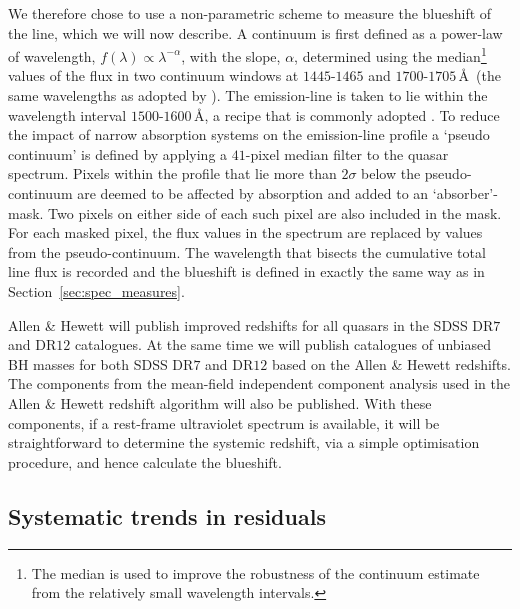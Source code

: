 We therefore chose to use a non-parametric scheme to measure the blueshift of the  line, which we will now describe. 
A continuum is first defined as a power-law of wavelength, $f(\lambda) \propto \lambda^{-\alpha}$, with the slope, $\alpha$, determined using the median\footnote{The median is used to improve the robustness of the continuum estimate from the relatively small wavelength intervals.} values of the flux in two continuum windows at $1445$-$1465$ and $1700$-$1705$\,\AA\, (the same wavelengths as adopted by \citet{shen11}). 
The  emission-line is taken to lie within the wavelength interval $1500$-$1600$\,\AA, a recipe that is commonly adopted \citep[e.g.][]{shen11, denney13}. 
To reduce the impact of narrow absorption systems on the emission-line profile a `pseudo continuum' is defined by applying a $41$-pixel median filter to the quasar spectrum.
Pixels within the  profile that lie more than $2\sigma$ below the pseudo-continuum are deemed to be affected by absorption and added to an `absorber'-mask. 
Two pixels on either side of each such pixel are also included in the mask. 
For each masked pixel, the flux values in the spectrum are replaced by values from the pseudo-continuum. 
The wavelength that bisects the cumulative total line flux is recorded and the blueshift is defined in exactly the same way as in Section~\ref{sec:spec_measures}. 

Allen \& Hewett will publish improved redshifts for all quasars in the SDSS DR$7$ and DR$12$ catalogues. 
At the same time we will publish catalogues of unbiased BH masses for both SDSS DR$7$ and DR$12$ based on the Allen \& Hewett redshifts. 
The components from the mean-field independent component analysis \citep[see][for an application to astronomical spectra]{allen13} used in the Allen \& Hewett redshift algorithm will also be published.
With these components, if a rest-frame ultraviolet spectrum is available, it will be straightforward to determine the systemic redshift, via a simple optimisation procedure, and hence calculate the  blueshift. 

\subsection{Systematic trends in residuals}

